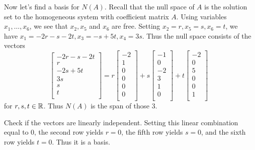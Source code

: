 \documentclass{article}
\begin{document}
\begin{example}
    Now let's find a basis for $N(A)$. Recall that the null space of $A$ is the solution set to the homogeneous system with coefficient matrix $A$. Using variables $x_1, \ldots, x_6$, we see that $x_2, x_5$ and $x_6$ are free. Setting $x_2 = r, x_5 = s, x_6 = t$, we have $x_1 = -2r - s - 2t, x_3 = -s + 5t, x_4 = 3s$. Thus the null space consists of the vectors \[
      \begin{bmatrix}
        -2r - s - 2t\\
        r\\
        -2s + 5t\\
        3s\\
        s\\
        t\\
      \end{bmatrix} = r
      \begin{bmatrix}
        -2\\
        1\\
        0\\0\\0\\0\\
      \end{bmatrix} + s
      \begin{bmatrix}
        -1\\0\\-2\\3\\1\\0\\
      \end{bmatrix} + t
      \begin{bmatrix}
        -2\\0\\5\\0\\0\\1\\
      \end{bmatrix}
    \]
    for $r, s, t \in \mathbb{R}$. Thus $N(A)$ is the span of those 3.

    Check if the vectors are linearly independent.
    Setting this linear combination equal to $0$, the second row yields $r = 0$, the fifth row yields $s = 0$, and the sixth row yields $t = 0$. Thus it is a basis.
  \end{example}
\end{document}
